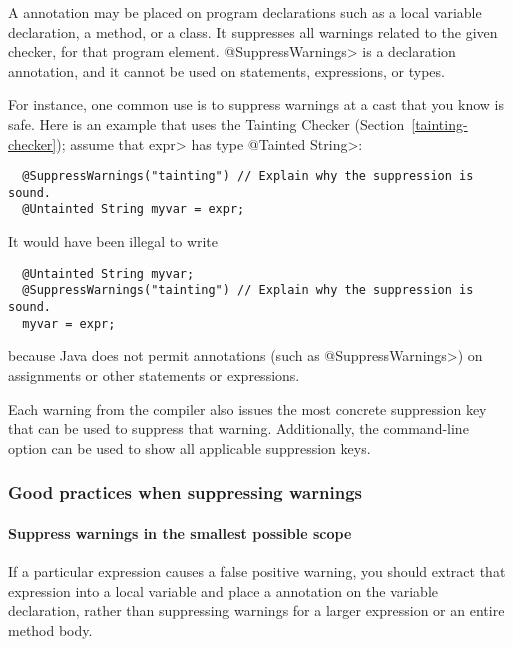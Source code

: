 A 
annotation may be placed on program declarations such as a local
variable declaration, a method, or a class.  It suppresses all warnings
related to the given checker, for that program element.
\<@SuppressWarnings> is a declaration annotation, and it cannot be used on
statements, expressions, or types.

For instance, one common use is
to suppress warnings at a cast that you know is safe.  Here is an example
that uses the Tainting Checker (Section~\ref{tainting-checker}); assume
that \<expr> has type \<@Tainted String>:

\begin{Verbatim}
  @SuppressWarnings("tainting") // Explain why the suppression is sound.
  @Untainted String myvar = expr;
\end{Verbatim}

\noindent
It would have been illegal to write

\begin{Verbatim}
  @Untainted String myvar;
  @SuppressWarnings("tainting") // Explain why the suppression is sound.
  myvar = expr;
\end{Verbatim}

\noindent
because Java does not permit annotations (such as \<@SuppressWarnings>) on
assignments or other statements or expressions.



Each warning from the compiler also issues the most concrete
suppression key that can be used to suppress that warning.
Additionally, the  command-line option
can be used to show all applicable suppression keys.


\subsubsection{Good practices when suppressing warnings}

\paragraph{Suppress warnings in the smallest possible scope}

If a particular expression causes a
false positive warning, you should extract that expression into a local variable
and place a  annotation on the variable
declaration, rather than suppressing warnings for a larger expression or an
entire method body.

